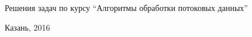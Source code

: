 \documentclass{article}
\begin{document}
\begin{center}
    {\Large Решения задач по курсу ``Алгоритмы обработки потоковых данных''}
    \vspace{0.3cm}

    {\large Казань, 2016}
\end{center}
\begin{flushright}
\par
\end{flushright}


\end{document}

